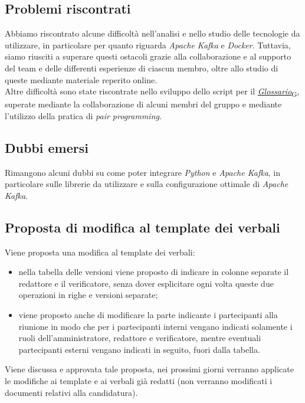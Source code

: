 \documentclass[italian,12pt]{article}
\begin{document}
\subsection{Problemi riscontrati}
Abbiamo riscontrato alcune difficoltà nell'analisi e nello studio delle tecnologie da utilizzare, in particolare per quanto riguarda \textit{Apache Kafka} e \textit{Docker}. Tuttavia, siamo riusciti a superare questi ostacoli grazie alla collaborazione e al supporto del team e delle differenti esperienze di ciascun membro, oltre allo studio di queste mediante materiale reperito online. \\
Altre difficoltà sono state riscontrate nello sviluppo dello script per il \href{https://7last.github.io/docs/rtb/documentazione-interna/glossario\#glossario}{\textit{Glossario}\textsubscript{G}}, superate mediante la collaborazione di alcuni membri del gruppo e mediante l'utilizzo della pratica di \textit{pair programming}.

\subsection{Dubbi emersi}
Rimangono alcuni dubbi su come poter integrare \textit{Python} e \textit{Apache Kafka}, in particolare sulle librerie da utilizzare e sulla configurazione ottimale di \textit{Apache Kafka}.

\subsection{Proposta di modifica al template dei verbali}
Viene proposta una modifica al template dei verbali:
\begin{itemize}
	\item nella tabella delle versioni viene proposto di indicare in colonne separate il redattore e il verificatore, senza dover esplicitare ogni volta queste due operazioni in righe e versioni separate;
	\item viene proposto anche di modificare la parte indicante i partecipanti alla riunione in modo che per i partecipanti interni vengano indicati solamente i ruoli dell'amministratore, redattore e verificatore, mentre eventuali partecipanti esterni vengano indicati in seguito, fuori dalla tabella.
\end{itemize}
Viene discussa e approvata tale proposta, nei prossimi giorni verranno applicate le modifiche ai template e ai verbali già redatti (non verranno modificati i documenti relativi alla candidatura).
\end{document}
